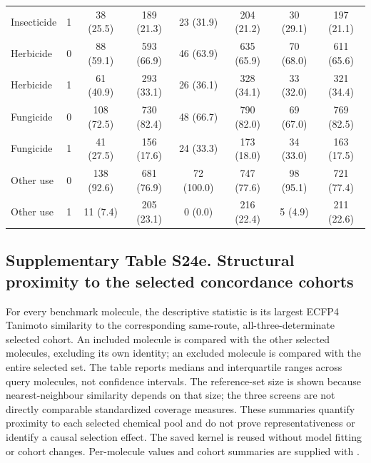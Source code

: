 \begin{longtable}{llcccccc}
Insecticide & 1 & 38 (25.5) & 189 (21.3) & 23 (31.9) & 204 (21.2) & 30 (29.1) & 197 (21.1) \\

Herbicide & 0 & 88 (59.1) & 593 (66.9) & 46 (63.9) & 635 (65.9) & 70 (68.0) & 611 (65.6) \\

Herbicide & 1 & 61 (40.9) & 293 (33.1) & 26 (36.1) & 328 (34.1) & 33 (32.0) & 321 (34.4) \\

Fungicide & 0 & 108 (72.5) & 730 (82.4) & 48 (66.7) & 790 (82.0) & 69 (67.0) & 769 (82.5) \\

Fungicide & 1 & 41 (27.5) & 156 (17.6) & 24 (33.3) & 173 (18.0) & 34 (33.0) & 163 (17.5) \\

Other use & 0 & 138 (92.6) & 681 (76.9) & 72 (100.0) & 747 (77.6) & 98 (95.1) & 721 (77.4) \\

Other use & 1 & 11 (7.4) & 205 (23.1) & 0 (0.0) & 216 (22.4) & 5 (4.9) & 211 (22.6) \\

\end{longtable}\endgroup

\subsection*{Supplementary Table S24e. Structural proximity to the selected concordance cohorts}

For every benchmark molecule, the descriptive statistic is its largest ECFP4 Tanimoto similarity to the corresponding same-route, all-three-determinate selected cohort. An included molecule is compared with the other selected molecules, excluding its own identity; an excluded molecule is compared with the entire selected set. The table reports medians and interquartile ranges across query molecules, not confidence intervals. The reference-set size is shown because nearest-neighbour similarity depends on that size; the three screens are not directly comparable standardized coverage measures. These summaries quantify proximity to each selected chemical pool and do not prove representativeness or identify a causal selection effect. The saved kernel is reused without model fitting or cohort changes. Per-molecule values and cohort summaries are supplied with .

